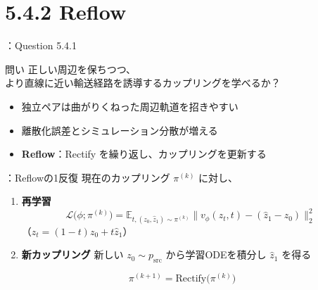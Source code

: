\section{5.4.2 Reflow}
\assuppl
\begin{frame}{\supplmark：Question 5.4.1}
    \begin{block}{問い}
        正しい周辺を保ちつつ、\\
        より直線に近い輸送経路を誘導するカップリングを学べるか？
    \end{block}
    \begin{itemize}
        \item 独立ペアは曲がりくねった周辺軌道を招きやすい
        \item 離散化誤差とシミュレーション分散が増える
        \item \textbf{Reflow}：Rectify を繰り返し、カップリングを更新する
    \end{itemize}
\end{frame}
\assuppl
\begin{frame}{\supplmark：Reflowの1反復}
    現在のカップリング $\pi^{(k)}$ に対し、
    \begin{enumerate}
        \item \textbf{再学習}
        \[
            \mathcal{L}\!\bigl(\phi;\pi^{(k)}\bigr)
            =
            \mathbb{E}_{t,(z_0,\hat{z}_1)\sim\pi^{(k)}}
            \bigl\|
                v_\phi(z_t,t)-(\hat{z}_1-z_0)
            \bigr\|_2^{2}
            \tag{5.4.1}
        \]
        （$z_t=(1-t)z_0+t\hat{z}_1$）
        \item \textbf{新カップリング}
        新しい $z_0\sim p_{\mathrm{src}}$ から学習ODEを積分し $\hat{z}_1$ を得る
    \end{enumerate}
    \[
        \pi^{(k+1)}=\mathrm{Rectify}\!\bigl(\pi^{(k)}\bigr)
        \tag{5.4.2}
    \]
\end{frame}
